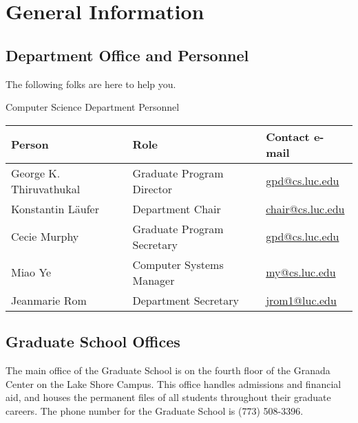 \documentclass[letterpaper,10pt,english]{sphinxmanual}
\begin{document}
\chapter{General Information}
\label{general:general-information}\label{general::doc}

\section{Department Office and Personnel}
\label{general:department-office-and-personnel}
The following folks are here to help you.


\begin{threeparttable}
\capstart\caption{Computer Science Department Personnel}

\begin{tabulary}{\linewidth}{|L|L|L|}
\hline
\textbf{
Person
} & \textbf{
Role
} & \textbf{
Contact e-mail
}\\\hline

George K. Thiruvathukal
 & 
Graduate Program Director
 & 
\href{mailto:gpd@cs.luc.edu}{gpd@cs.luc.edu}
\\\hline

Konstantin Läufer
 & 
Department Chair
 & 
\href{mailto:chair@cs.luc.edu}{chair@cs.luc.edu}
\\\hline

Cecie Murphy
 & 
Graduate Program Secretary
 & 
\href{mailto:gpd@cs.luc.edu}{gpd@cs.luc.edu}
\\\hline

Miao Ye
 & 
Computer Systems Manager
 & 
\href{mailto:my@cs.luc.edu}{my@cs.luc.edu}
\\\hline

Jeanmarie Rom
 & 
Department Secretary
 & 
\href{mailto:jrom1@luc.edu}{jrom1@luc.edu}
\\\hline
\end{tabulary}

\end{threeparttable}



\section{Graduate School Offices}
\label{general:graduate-school-offices}
The main office of the Graduate School is on the fourth floor of the Granada Center on the Lake Shore Campus. This office handles admissions and financial aid, and houses the permanent files of all students throughout their graduate careers. The phone number for the Graduate School is (773) 508-3396.
\end{document}
